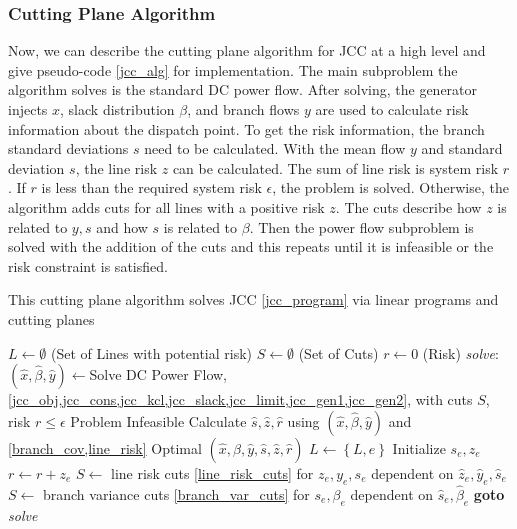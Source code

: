 \subsubsection*{Cutting Plane Algorithm}
Now, we can describe the cutting plane algorithm for JCC at a high level and give pseudo-code \ref{jcc_alg} for implementation.  The main subproblem the algorithm solves is the standard DC power flow.  After solving, the generator injects $x$, slack distribution $\beta$, and branch flows $y$ are used to calculate risk information about the dispatch point.  To get the risk information, the branch standard deviations $s$ need to be calculated.  With the mean flow $y$ and standard deviation $s$, the line risk $z$ can be calculated.  The sum of line risk is system risk $r$.  If $r$ is less than the required system risk $\epsilon$, the problem is solved.  Otherwise, the algorithm adds cuts for all lines with a positive risk $z$.  The cuts describe how $z$ is related to $y,s$ and how $s$ is related to $\beta$.  Then the power flow subproblem is solved with the addition of the cuts and this repeats until it is infeasible or the risk constraint is satisfied.
\begin{algorithm}
\caption[Cutting plane algorithm for joint chance constraint model]{This cutting plane algorithm solves JCC \ref{jcc_program} via linear programs and cutting planes}\label{jcc_alg}
\begin{algorithmic}
\State $L \gets \emptyset$  (Set of Lines with potential risk)
\State $S \gets \emptyset$  (Set of Cuts)
\State $r \gets 0$ (Risk)
\BState \emph{solve}:
\State $(\hat{x},\hat{\beta},\hat{y}) \gets $Solve DC Power Flow, \cref{jcc_obj,jcc_cons,jcc_kcl,jcc_slack,jcc_limit,jcc_gen1,jcc_gen2}, with cuts $S$, risk $r\leq\epsilon$
 \Return Problem Infeasible 
\EndIf
\State Calculate $\hat{s},\hat{z},\hat{r}$ using $(\hat{x},\hat{\beta},\hat{y})$ and \cref{branch_cov,line_risk}
 \Return Optimal $(\hat{x},\hat{\beta},\hat{y},\hat{s},\hat{z},\hat{r})$
\EndIf
{}
            \State $L \gets \left\{L,e\right\}$
            \State Initialize $s_e,z_e$
            \State $r \gets r + z_e$
    \EndIf            
    \State $S \gets$ line risk cuts \ref{line_risk_cuts} for $z_e,y_e,s_e$ dependent on $\hat{z}_e,\hat{y}_e,\hat{s}_e$
    \State $S \gets$ branch variance cuts \ref{branch_var_cuts} for $s_e,\beta_e$ dependent on $\hat{s}_e,\hat{\beta}_e$
\EndIf
\EndFor
\State \textbf{goto} \emph{solve}
\EndProcedure
\end{algorithmic}
\end{algorithm}





